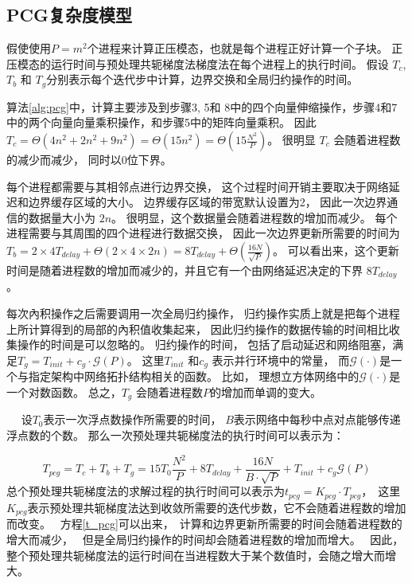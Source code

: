 \subsection{PCG复杂度模型}
\label{solver:pcgComplex}
假使使用$P=m^2$个进程来计算正压模态，也就是每个进程正好计算一个子块。 
正压模态的运行时间与预处理共轭梯度法梯度法在每个进程上的执行时间。 
假设 $T_c$, $T_b$ 和 $T_g$分别表示每个迭代步中计算，边界交换和全局归约操作的时间。 

 算法\ref{alg:pcg}中，计算主要涉及到步骤3, 5和 8中的四个向量伸缩操作，步骤4和7中的两个向量向量乘积操作，和步骤5中的矩阵向量乘积。 
 因此 $T_c= \Theta (4 n^2 +2n^2+ 9n^2) = \Theta (15n^2) =\Theta(15\frac{N^2}{P})$。 
很明显 $T_c$ 会随着进程数的减少而减少， 同时以0位下界。 


每个进程都需要与其相邻点进行边界交换， 这个过程时间开销主要取决于网络延迟和边界缓存区域的大小。 
边界缓存区域的带宽默认设置为2， 因此一次边界通信的数据量大小为 $2n$。 
很明显，这个数据量会随着进程数的增加而减少。 
每个进程需要与其周围的四个进程进行数据交换， 因此一次边界更新所需要的时间为$T_b =2\times4T_{delay} +\Theta (2\times4\times 2n)=8T_{delay} +\Theta (\frac{16N}{\sqrt{P}})$。 
可以看出来，这个更新时间是随着进程数的增加而减少的，并且它有一个由网络延迟决定的下界 $8T_{delay}$。 

 
每次內积操作之后需要调用一次全局归约操作， 归约操作实质上就是把每个进程上所计算得到的局部的內积值收集起来，
因此归约操作的数据传输的时间相比收集操作的时间是可以忽略的。 
归约操作的时间， 包括了启动延迟和网络阻塞，满足$T_g= T_{init}+ c_g\cdot \mathcal{G}(P)$。 
这里$T_{init}$ 和$c_g$ 表示并行环境中的常量， 而$\mathcal{G}(\cdot)$是一个与指定架构中网络拓扑结构相关的函数。 
比如， 理想立方体网络中的$\mathcal{G}(\cdot)$是一个对数函数。 
总之，$T_g$ 会随着进程数$P$的增加而单调的变大。 
 

　
设$T_0$表示一次浮点数操作所需要的时间， $B$表示网络中每秒中点对点能够传递浮点数的个数。 
那么一次预处理共轭梯度法的执行时间可以表示为：

\begin{equation}
\label{t_pcg}
T_{pcg} = T_c + T_b + T_g
= 15 T_0\frac{N^2}{P} + 8T_{delay} + \frac{16N}{B\cdot\sqrt{P}}+T_{init} +c_g\mathcal{G}(P)
\end{equation}
总个预处理共轭梯度法的求解过程的执行时间可以表示为$t_{pcg} = K_{pcg}\cdot T_{pcg}$，　这里$K_{pcg}$表示预处理共轭梯度法达到收敛所需要的迭代步数，它不会随着进程数的增加而改变。　
方程\ref{t_pcg}可以出来，　计算和边界更新所需要的时间会随着进程数的增大而减少，　
但是全局归约操作的时间却会随着进程数的增加而增大。　
因此，整个预处理共轭梯度法的运行时间在当进程数大于某个数值时，会随之增大而增大。　

